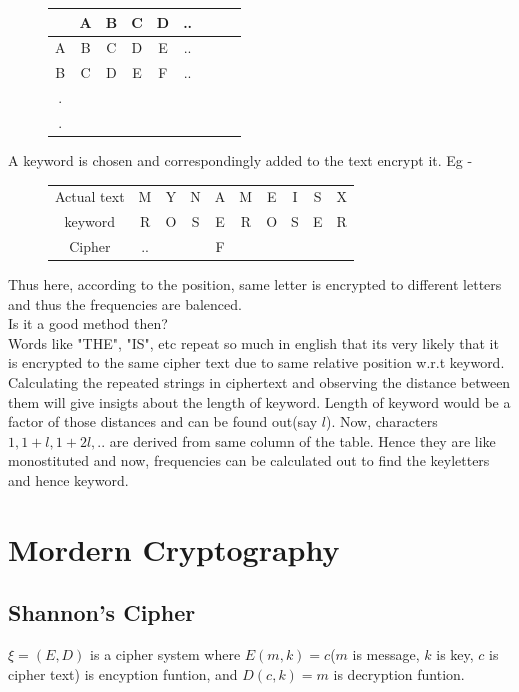 \documentclass[english, 11pt]{article}
\begin{document}
\begin{figure}[ht]
  \centering
      \begin{tabular}{|c|c|c|c|c|c|c|c|c|}
          \hline
            & A & B & C & D & ..\\
          \hline
          A & B & C & D & E & ..\\
          B & C & D & E & F & ..\\
          . &   &   &   &   &   \\
          . &   &   &   &   &   \\
          \hline
      \end{tabular}
\end{figure}
A keyword is chosen and correspondingly added to the text encrypt it. Eg -
\begin{figure}[ht]
  \centering
      \begin{tabular}{|c|ccccccccc|}
          \hline
          Actual text & M & Y & N & A & M & E & I & S & X \\
          keyword     & R & O & S & E & R & O & S & E & R \\
          \hline
          Cipher      & .. &   &   & F &   &   &   &   & \\
          \hline
      \end{tabular}
\end{figure}
Thus here, according to the position, same letter is encrypted to different letters and thus the frequencies are balenced.\\
Is it a good method then? \\
Words like "THE", "IS", etc repeat so much in english that its very likely that it is encrypted to the same cipher text due to same relative position w.r.t keyword. Calculating the repeated strings in ciphertext and observing the distance between them will give insigts about the length of keyword.
Length of keyword would be a factor of those distances and can be found out(say $l$). Now, characters $1,1+l,1+2l,..$ are derived from same column of the table. Hence they are like monostituted and now, frequencies can be calculated out to find the keyletters and hence keyword.

\section*{Mordern Cryptography}
\subsection*{Shannon's Cipher}
$\xi = (E,D)$ is a cipher system where $E(m,k) = c$($m$ is message, $k$ is key, $c$ is cipher text) is encyption funtion, and $D(c,k) = m$ is decryption funtion.
\end{document}
